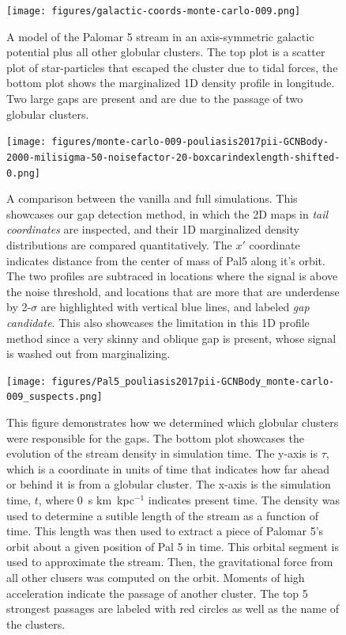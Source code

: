 \documentclass[]{aa}
\begin{document}
  \begin{figure}
    \centering
    \texttt{[image: figures/galactic-coords-monte-carlo-009.png]}
    \caption[]{A model of the Palomar 5 stream in an axis-symmetric galactic potential plus all other globular clusters. The top plot is a scatter plot of star-particles that escaped the cluster due to tidal forces, the bottom plot shows the marginalized 1D density profile in longitude. Two large gaps are present and are due to the passage of two globular clusters. }
    \end{figure}


  \begin{figure}
    \centering
    \texttt{[image: figures/monte-carlo-009-pouliasis2017pii-GCNBody-2000-milisigma-50-noisefactor-20-boxcarindexlength-shifted-0.png]}
    \caption[]{A comparison between the vanilla and full simulations. This showcases our gap detection method, in which the 2D maps in \textit{tail coordinates} are inspected, and their 1D marginalized density distributions are compared quantitatively. The $x'$ coordinate indicates distance from the center of mass of Pal5 along it's orbit. The two profiles are subtraced in locations where the signal is above the noise threshold, and locations that are more that are underdense by 2-$\sigma$ are highlighted with vertical blue lines, and labeled \textit{gap candidate}. This also showcases the limitation in this 1D profile method since a very skinny and oblique gap is present, whose signal is washed out from marginalizing.}
    \label{fig:profiles}
    \end{figure}  


  \begin{figure}
    \centering
    \texttt{[image: figures/Pal5\_pouliasis2017pii-GCNBody\_monte-carlo-009\_suspects.png]}
    \caption[]{This figure demonstrates how we determined which globular clusters were responsible for the gaps. The bottom plot showcases the evolution of the stream density in simulation time. The y-axis is $\tau$, which is a coordinate in units of time that indicates how far ahead or behind it is from a globular cluster. The x-axis is the simulation time, $t$, where 0~s km~kpc$^{-1}$ indicates present time. The density was used to determine a sutible length of the stream as a function of time. This length was then used to extract a piece of Palomar 5's orbit about a given position of Pal 5 in time. This orbital segment is used to approximate the stream. Then, the gravitational force from all other clusers was computed on the orbit. Moments of high acceleration indicate the passage of another cluster. The top 5 strongest passages are labeled with red circles as well as the name of the clusters. }
    \label{fig:profiles}
    \end{figure}  
\end{document}
